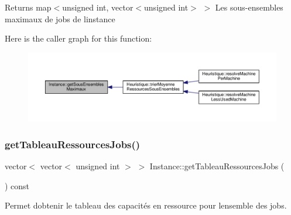 \begin{DoxyReturn}{Returns}
map$<$unsigned int, vector$<$unsigned int$>$ $>$ Les sous-\/ensembles maximaux de jobs de l\textquotesingle{}instance 
\end{DoxyReturn}
Here is the caller graph for this function\+:
\nopagebreak
\begin{figure}[H]
\begin{center}
\leavevmode
\includegraphics[width=350pt]{classInstance_a2011ff3253fcb1d2d354c3c34a14a6fb_icgraph}
\end{center}
\end{figure}
\mbox{\label{classInstance_ad4124bd2f1edb83a46ef94cfe07eafc8}} 
\subsubsection{\texorpdfstring{get\+Tableau\+Ressources\+Jobs()}{getTableauRessourcesJobs()}}
{\footnotesize\ttfamily vector$<$ vector$<$ unsigned int $>$ $>$ Instance\+::get\+Tableau\+Ressources\+Jobs (\begin{DoxyParamCaption}{ }\end{DoxyParamCaption}) const}



Permet d\textquotesingle{}obtenir le tableau des capacités en ressource pour l\textquotesingle{}ensemble des jobs. 

